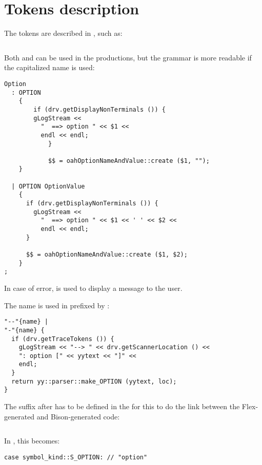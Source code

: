\section{Tokens description}\label{Tokens description}

The tokens are described in , such as:
\begin{lstlisting}[language=Bison]
%token <string> OPTION "option"
\end{lstlisting}

Both  and  can be used in the productions, but the grammar is more readable if the capitalized name is used:
\begin{lstlisting}[language=Bison]
Option
  : OPTION
    {
	    if (drv.getDisplayNonTerminals ()) {
        gLogStream <<
          "  ==> option " << $1 <<
          endl << endl;
			}

			$$ = oahOptionNameAndValue::create ($1, "");
    }

  | OPTION OptionValue
    {
      if (drv.getDisplayNonTerminals ()) {
        gLogStream <<
          "  ==> option " << $1 << ' ' << $2 <<
          endl << endl;
      }

      $$ = oahOptionNameAndValue::create ($1, $2);
    }
;
\end{lstlisting}

In case of error,  is used to display a message to the user.

The name  is used in  prefixed by :
\begin{lstlisting}[language=Flex]
"--"{name} |
"-"{name} {
  if (drv.getTraceTokens ()) {
    gLogStream << "--> " << drv.getScannerLocation () <<
    ": option [" << yytext << "]" <<
    endl;
  }
  return yy::parser::make_OPTION (yytext, loc);
}
\end{lstlisting}

The suffix after  has to be defined in the  for this to do the link between the Flex-generated and Bison-generated code:
\begin{lstlisting}[language=Terminal]
%token <string> OPTION "option"
\end{lstlisting}

In , this becomes:
\begin{lstlisting}[language=CPlusPlus]
      case symbol_kind::S_OPTION: // "option"
\end{lstlisting}

